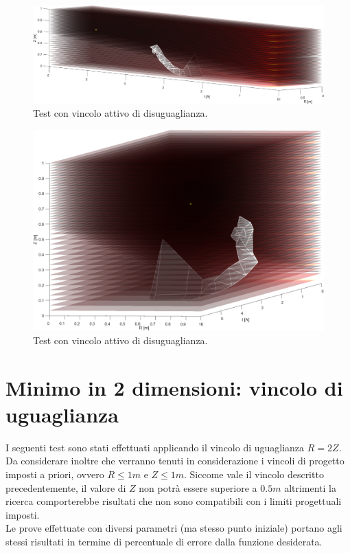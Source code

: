 \documentclass[a4paper, 11pt]{article}
\begin{document}
\begin{figure}[H]
    \centering
        \includegraphics[width=16cm]{assets/figure8}
        \caption{Test con vincolo attivo di disuguaglianza.}
\end{figure}
\noindent

\begin{figure}[H]
    \centering
        \includegraphics[width=12cm]{assets/figure9}
        \caption{Test con vincolo attivo di disuguaglianza.}
\end{figure} 

\newpage
\section{Minimo in 2 dimensioni: vincolo di uguaglianza}

I seguenti test sono stati effettuati applicando il vincolo di uguaglianza $R =
2Z$. Da considerare inoltre che verranno tenuti in considerazione i vincoli di
progetto imposti a priori, ovvero $R \le 1m$ e $Z \le 1m$. Siccome vale il
vincolo descritto precedentemente, il valore di $Z$ non potrà essere superiore a
$0.5m$ altrimenti la ricerca comporterebbe risultati che non sono compatibili
con i limiti progettuali imposti. \\
Le prove effettuate con diversi parametri (ma stesso punto iniziale) portano
agli stessi risultati in termine di percentuale di errore dalla funzione
desiderata.
\end{document}
